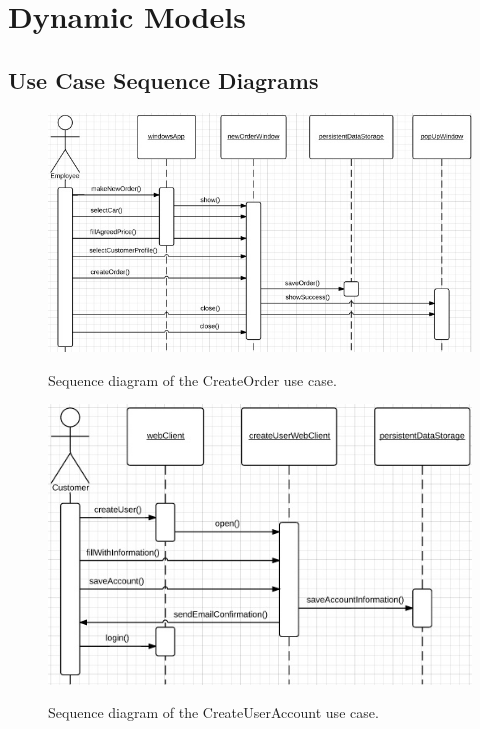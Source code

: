 \section{Dynamic Models}

\subsection{Use Case Sequence Diagrams}
\begin{figure}[h!]
	\centering
		\includegraphics[scale=0.8]{Figures/SequenceDiagram-CreateOrder}\\
	\caption{Sequence diagram of the CreateOrder use case.}
  \label{fig:SequenceDiagram-CreateOrder}
\end{figure}
\begin{figure}[h!]
	\centering
		\includegraphics[scale=0.8]{Figures/SequenceDiagram-CreateUserAccount}\\
	\caption{Sequence diagram of the CreateUserAccount use case.}
  \label{fig:SequenceDiagram-CreateUserAccount}
\end{figure}
